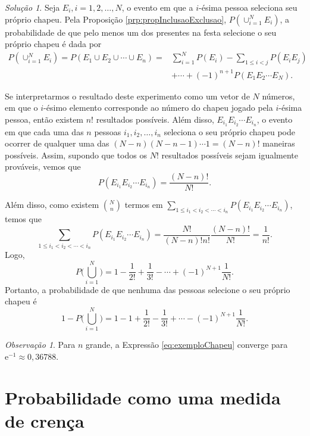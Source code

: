 \documentclass[]{book}
\theoremstyle{definition}
\theoremstyle{definition}
\theoremstyle{definition}
\theoremstyle{remark}
\newtheorem*{remark}{Observação}
\newtheorem*{solution}{Solução}
\begin{document}
\begin{solution}
\iffalse{} {Solução. } \fi{}Seja \(E_i, i=1,2,\ldots,N\), o evento em que a \(i\)-ésima pessoa seleciona seu próprio chapeu.
Pela Proposição \ref{prp:propInclusaoExclusao}, \(P(\cup_{i=1}^{N}E_i)\), a probabilidade de que pelo menos um dos presentes na festa selecione o seu próprio chapeu é dada por
\begin{align}
P(\cup_{i=1}^{N}E_i)=P(E_1\cup E_2 \cup\cdots\cup E_n) =& \sum_{i=1}^{N}P(E_i) - \sum_{1\leq i <j}P(E_i E_j) \\ &+ \cdots +(-1)^{n+1}P(E_1 E_2 \cdots E_N).
\end{align}

Se interpretarmos o resultado deste experimento como um vetor de \(N\) números, em que o \(i\)-ésimo elemento corresponde ao número do chapeu jogado pela \(i\)-ésima pessoa, então existem \(n!\) resultados possíveis.
Além disso, \(E_{i_1}E_{i_2}\cdots E_{i_n}\), o evento em que cada uma das \(n\) pessoas
\(i_1, i_2, \ldots, i_n\) seleciona o seu próprio chapeu pode ocorrer de qualquer uma das \((N-n)(N-n-1)\cdots 1=(N-n)!\) maneiras possíveis.
Assim, supondo que todos os \(N!\) resultados possíveis sejam igualmente prováveis, vemos que
\[P(E_{i_1}E_{i_2}\cdots E_{i_n}) = \frac{(N-n)!}{N!}.\]

Além disso, como existem \({N \choose n}\) termos em \(\sum_{1\leq i_1<i_2 < \cdots < i_n}P(E_{i_1}E_{i_2}\cdots E_{i_n})\), temos que
\[\sum_{1\leq i_1<i_2 < \cdots < i_n}P(E_{i_1}E_{i_2}\cdots E_{i_n}) = \frac{N!}{(N-n)!n!}\frac{(N-n)!}{N!} = \frac{1}{n!}.\]
Logo,
\[P\Bigg(\bigcup_{i=1}^{N}\Bigg) = 1 - \frac{1}{2!} + \frac{1}{3!} - \cdots + (-1)^{N+1}\frac{1}{N!}.\]
Portanto, a probabilidade de que nenhuma das pessoas selecione o seu próprio chapeu é
\begin{equation}
1 - P\Bigg(\bigcup_{i=1}^{N}\Bigg) = 1 - 1 + \frac{1}{2!} - \frac{1}{3!} + \cdots - (-1)^{N+1}\frac{1}{N!}.
\label{eq:exemploChapeu}
\end{equation}
\end{solution}

\begin{remark}
\iffalse{} {Observação. } \fi{}Para \(n\) grande, a Expressão \eqref{eq:exemploChapeu} converge para \(\mathrm{e}^{-1}\approx 0{,}36788\).
\end{remark}

\hypertarget{probabilidade-como-uma-medida-de-crenuxe7a}{%
\section{Probabilidade como uma medida de crença}\label{probabilidade-como-uma-medida-de-crenuxe7a}}
\end{document}
